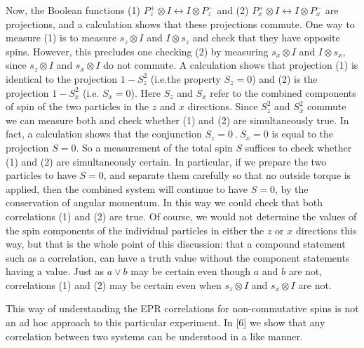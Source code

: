 \documentclass{article}
\begin{document}
 Now, the Boolean functions (1) $P_z^+\otimes I\leftrightarrow I\otimes P_z^-$  and (2) $P_x^+\otimes I \leftrightarrow I\otimes P_x^-$ are projections, and a calculation shows that these projections commute. One way to measure (1) is to measure $s_z\otimes I$ and $I\otimes s_z$ and check that they have opposite spins. However, this precludes one checking (2) by measuring $s_x\otimes I$ and $I\otimes s_x$, since $s_z\otimes I$ and $s_x\otimes I$ do not commute. A calculation shows that projection (1) is identical to the projection $1-S_z^2$   (i.e.the property $S_z = 0$) and (2) is the projection $1- S_x^2$ (i.e. $S_x = 0$). Here $S_z$ and $S_x$ refer to the combined components of spin of the two particles in the $z$ and $x$ directions. Since $S_z^2$ and $S_x^2$ commute we can measure both and check whether (1) and (2) are simultaneously true. In fact, a calculation shows that the conjunction $S_z = 0\ .  \ S_x = 0$ is equal to the projection $S = 0.$ So a measurement of the total spin $S$ suffices to check whether (1) and (2) are simultaneously certain. In particular, if we prepare the two particles to have $S=0$, and separate them carefully so that no outside torque is applied, then the combined system will continue to have $S=0$, by the conservation of angular momentum. In this way we could check that both correlations (1) and (2) are true.  Of course, we would not determine the values of the spin components of the individual particles  in either the $z$ or $x$ directions this way, but that is the whole point of this discussion: that a compound statement such as a correlation, can have a truth value without the component statements having a value. Just as $a \vee b$ may be certain even though $a$ and $b$ are not, correlations (1) and (2) may be certain even when $s_z\otimes I$ and $s_x\otimes I$ are not.

 This way of understanding the EPR correlations for non-commutative spins is not an ad hoc approach to this particular experiment. In [6]  we show that any correlation between two systems can be understood in a like manner.                                
\end{document}
